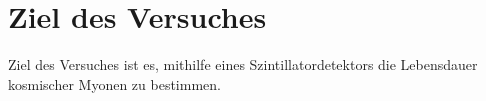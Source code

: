 \section{Ziel des Versuches}
\label{sec:versuchsziel}

Ziel des Versuches ist es, mithilfe eines Szintillatordetektors die Lebensdauer kosmischer Myonen zu bestimmen.